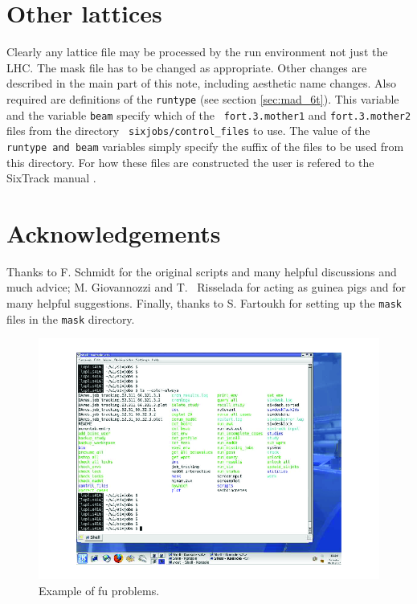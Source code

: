 \documentclass{cernatsnote}
\begin{document}
\section{Other lattices}
\label{sec:otherlattices}

Clearly any lattice file may be processed by the run environment not just the
LHC. The mask file has to be changed as appropriate.  Other changes are
described in the main part of this note, including aesthetic name changes. Also
required are definitions of the {\tt runtype} (see section \ref{sec:mad_6t}).
This variable and the variable {\tt beam} specify which of the {\tt
fort.3.mother1} and {\tt fort.3.mother2} files from the directory {\tt
sixjobs/control\_files} to use. The value of the {\tt runtype and beam}
variables simply specify the suffix of the files to be used from this
directory. For how these files are constructed the user is refered to the
SixTrack manual \cite{SixTrack}.

\section{Acknowledgements}
Thanks to F. Schmidt for the original scripts and many helpful discussions and
much advice; M. Giovannozzi and T. ~Risselada for acting as guinea pigs and for
many helpful suggestions.  Finally, thanks to S. Fartoukh for setting up the
{\tt mask} files in the {\tt mask} directory.

\begin{figure}[tb]
\centering
\includegraphics*[width=200mm]{print}
\caption{Example of fu problems.}
\label{dir}
\end{figure}
\end{document}
